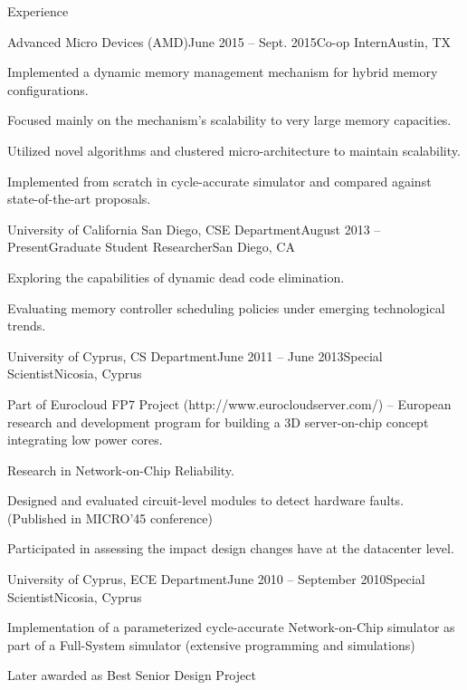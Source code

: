 \documentclass{resume} %
\begin{document}
\begin{rSection}{Experience}

\begin{rSubsection}{Advanced Micro Devices (AMD)}{June 2015 -- Sept. 2015}{Co-op Intern}{Austin, TX}
	\item Implemented a dynamic memory management mechanism for hybrid memory configurations.
	\item Focused mainly on the mechanism's scalability to very large memory capacities.
	\item Utilized novel algorithms and clustered micro-architecture to maintain scalability.
	\item Implemented from scratch in cycle-accurate simulator and compared against state-of-the-art proposals.
\end{rSubsection}

\begin{rSubsection}{University of California San Diego, CSE Department}{August 2013 -- Present}{Graduate Student Researcher}{San Diego, CA}
	\item Exploring the capabilities of dynamic dead code elimination.
	\item Evaluating memory controller scheduling policies under emerging technological trends.
\end{rSubsection}


\begin{rSubsection}{University of Cyprus, CS Department}{June 2011 -- June 2013}{Special Scientist}{Nicosia, Cyprus}
	\item Part of Eurocloud FP7 Project (http://www.eurocloudserver.com/) -- European research and development program for building a 3D server-on-chip concept integrating low power cores.
	\item Research in Network-on-Chip Reliability.
	\item Designed and evaluated circuit-level modules to detect hardware faults. (Published in MICRO'45 conference)
	\item Participated in assessing the impact design changes have at the datacenter level.
\end{rSubsection}


\begin{rSubsection}{University of Cyprus, ECE Department}{June 2010 -- September 2010}{Special Scientist}{Nicosia, Cyprus}
	\item Implementation of a parameterized cycle-accurate Network-on-Chip simulator as part of a Full-System simulator (extensive programming and simulations)
	\item Later awarded as Best Senior Design Project
\end{rSubsection}


\end{rSection}
\end{document}
